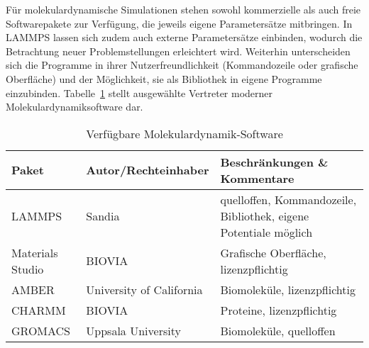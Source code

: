 Für molekulardynamische Simulationen stehen sowohl kommerzielle als auch freie Softwarepakete zur Verfügung, die jeweils eigene Parametersätze mitbringen.
In LAMMPS lassen sich zudem auch externe Parametersätze einbinden, wodurch die Betrachtung neuer Problemstellungen erleichtert wird.
Weiterhin unterscheiden sich die Programme in ihrer Nutzerfreundlichkeit (Kommandozeile oder grafische Oberfläche) und der Möglichkeit, sie als Bibliothek in eigene Programme einzubinden.
Tabelle~\ref{tab:mdsoftware} stellt ausgewählte Vertreter moderner Molekulardynamiksoftware dar.

\begin{table}[hb]
  \oddrowcolors
  \caption[Verfügbare Molekulardynamik-Software]{
    Verfügbare Molekulardynamik-Software
  }
  \label{tab:mdsoftware}
  \begin{tabularx}{\textwidth}{|llX|}
    \hline
    \textbf{Paket}                                                               & \textbf{Autor/Rechteinhaber}   & \textbf{Beschränkungen \& Kommentare}                            \\
    \hline
    LAMMPS\cite{plimpton_lammps_2014,plimpton_fast_1995}                         & Sandia                   & quelloffen, Kommandozeile, Bibliothek, eigene Potentiale möglich \\
    Materials Studio\cite{biovia_materials_2014}                                 & BIOVIA                   & Grafische Oberfläche, lizenzpflichtig                            \\
    AMBER\cite{case_amber_2014,case_amber_2005}                                  & University of California & Biomoleküle, lizenzpflichtig                                     \\
    CHARMM\cite{brooks_charmm_2014,brooks_charmm:_1983,brooks_charmm:_2009}      & BIOVIA                   & Proteine, lizenzpflichtig                                        \\
    GROMACS\cite{lindahl_gromacs_2014,berendsen_gromacs:_1995,hess_gromacs_2008} & Uppsala University       & Biomoleküle, quelloffen                                          \\
    \hline
  \end{tabularx}
\end{table}
